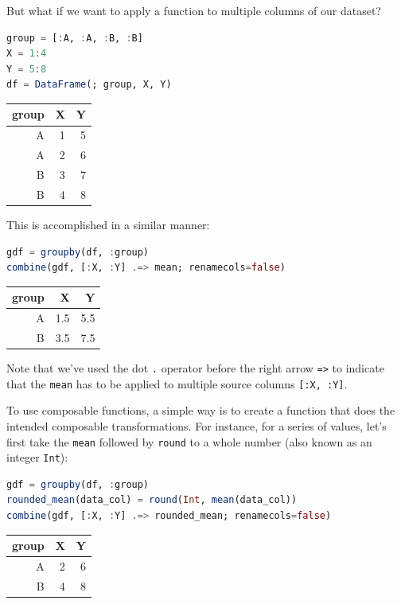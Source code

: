 \documentclass[
  notoc %
]{tufte-book}
\newcommand{\passthrough}[1]{#1}
\begin{document}
But what if we want to apply a function to multiple columns of our
dataset?

\begin{lstlisting}[language=Julia]
group = [:A, :A, :B, :B]
X = 1:4
Y = 5:8
df = DataFrame(; group, X, Y)
\end{lstlisting}

\begin{longtable}[]{@{}rrr@{}}
\toprule
group & X & Y \\
\midrule
\endhead
A & 1 & 5 \\
A & 2 & 6 \\
B & 3 & 7 \\
B & 4 & 8 \\
\bottomrule
\end{longtable}

This is accomplished in a similar manner:

\begin{lstlisting}[language=Julia]
gdf = groupby(df, :group)
combine(gdf, [:X, :Y] .=> mean; renamecols=false)
\end{lstlisting}

\begin{longtable}[]{@{}rrr@{}}
\toprule
group & X & Y \\
\midrule
\endhead
A & 1.5 & 5.5 \\
B & 3.5 & 7.5 \\
\bottomrule
\end{longtable}

Note that we've used the dot \passthrough{\lstinline!.!} operator before
the right arrow \passthrough{\lstinline!=>!} to indicate that the
\passthrough{\lstinline!mean!} has to be applied to multiple source
columns \passthrough{\lstinline![:X, :Y]!}.

To use composable functions, a simple way is to create a function that
does the intended composable transformations. For instance, for a series
of values, let's first take the \passthrough{\lstinline!mean!} followed
by \passthrough{\lstinline!round!} to a whole number (also known as an
integer \passthrough{\lstinline!Int!}):

\begin{lstlisting}[language=Julia]
gdf = groupby(df, :group)
rounded_mean(data_col) = round(Int, mean(data_col))
combine(gdf, [:X, :Y] .=> rounded_mean; renamecols=false)
\end{lstlisting}

\begin{longtable}[]{@{}rrr@{}}
\toprule
group & X & Y \\
\midrule
\endhead
A & 2 & 6 \\
B & 4 & 8 \\
\bottomrule
\end{longtable}
\end{document}
